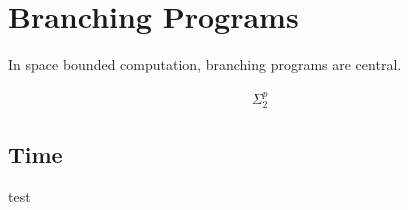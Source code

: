 \section*{Branching Programs}

In space bounded computation, branching programs are central.

\begin{align*}
	\Sigma_2^p 
\end{align*}

\subsection*{Time}

test